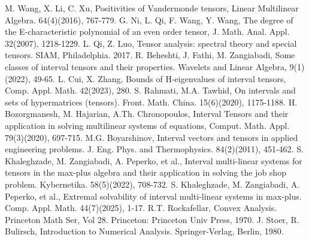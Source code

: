 \documentclass[twoside]{article}
\begin{document}
\begin{thebibliography}{ }
 M. Wang, X. Li, C. Xu, Positivities of Vandermonde tensors, Linear Multilinear Algebra. 64(4)(2016), 767-779.
 G. Ni, L. Qi, F. Wang, Y. Wang, The degree of the E-characteristic polynomial of an even order tensor, J. Math. Anal. Appl. 32(2007), 1218-1229.
 L. Qi, Z. Luo, Tensor analysis: spectral theory and special tensors. SIAM, Philadelphia. 2017.
 R. Beheshti, J. Fathi, M. Zangiabadi, Some classes of interval tensors and their properties. Wavelets and Linear Algebra, 9(1)(2022), 49-65.
 L. Cui, X. Zhang, Bounds of H-eigenvalues of interval tensors, Comp. Appl. Math. 42(2023), 280.
 S. Rahmati, M.A. Tawhid, On intervals and sets of hypermatrices (tensors). Front. Math. China. 15(6)(2020), 1175-1188.
 H. Bozorgmanesh, M. Hajarian, A.Th. Chronopoulos, Interval Tensors and their application in solving multilinear systems of equations, Comput. Math. Appl. 79(3)(2020), 697-715.
  M.G. Boyarshinov, Interval vectors and tensors in applied engineering problems. J. Eng. Phys. and Thermophysics. 84(2)(2011), 451-462.
 S. Khaleghzade, M. Zangiabadi, A. Peperko, et al., Interval multi-linear systems for tensors in the max-plus algebra and their application in solving the job shop problem. Kybernetika. 58(5)(2022), 708-732.
 S. Khaleghzade, M. Zangiabadi, A. Peperko, et al., Extremal solvability of interval multi-linear systems in max-plus. Comp. Appl. Math. 44(7)(2025), 1-17.
 R.T. Rockafellar, Convex Analysis. Princeton Math Ser, Vol 28. Princeton: Princeton Univ Press, 1970.
 J. Stoer, R. Bulirsch, Introduction to Numerical Analysis. Springer-Verlag, Berlin, 1980.
\end{thebibliography}
\end{document}
